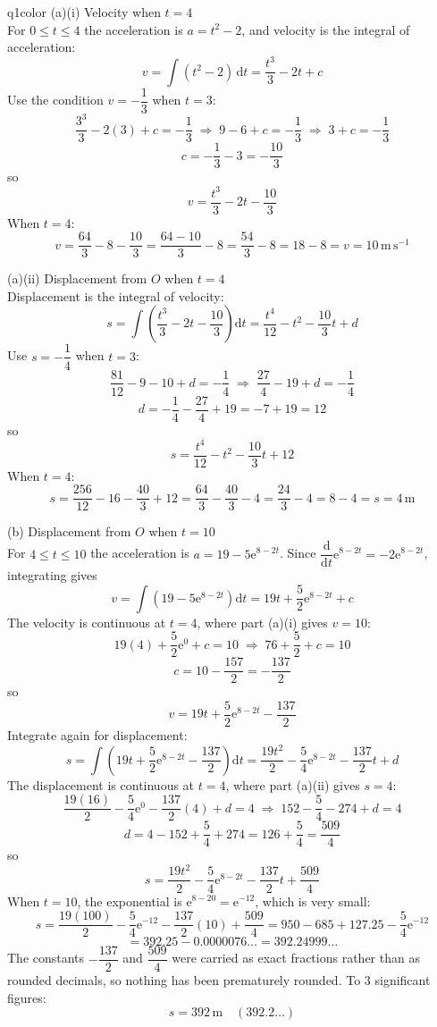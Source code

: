 \documentclass[11pt,a4paper]{article}
\newcommand{\dd}{\mathrm{d}}
\begin{document}
\begin{ansbox}{q1color}
(a)(i) Velocity when $t = 4$\\[4pt]
For $0 \le t \le 4$ the acceleration is $a = t^2 - 2$, and velocity is the integral of acceleration:
\[
v = \int (t^2 - 2)\,\dd t = \frac{t^3}{3} - 2t + c
\]
Use the condition $v = -\dfrac{1}{3}$ when $t = 3$:
\[
\frac{3^3}{3} - 2(3) + c = -\frac{1}{3} \;\Rightarrow\; 9 - 6 + c = -\frac{1}{3} \;\Rightarrow\; 3 + c = -\frac{1}{3}
\]
\[
c = -\frac{1}{3} - 3 = -\frac{10}{3}
\]
so
\[
v = \frac{t^3}{3} - 2t - \frac{10}{3}
\]
When $t = 4$:
\[
v = \frac{64}{3} - 8 - \frac{10}{3} = \frac{64 - 10}{3} - 8 = \frac{54}{3} - 8 = 18 - 8 = \boxed{v = 10 \,\text{m}\,\text{s}^{-1}}
\]

(a)(ii) Displacement from $O$ when $t = 4$\\[4pt]
Displacement is the integral of velocity:
\[
s = \int\left(\frac{t^3}{3} - 2t - \frac{10}{3}\right)\dd t = \frac{t^4}{12} - t^2 - \frac{10}{3}t + d
\]
Use $s = -\dfrac{1}{4}$ when $t = 3$:
\[
\frac{81}{12} - 9 - 10 + d = -\frac{1}{4} \;\Rightarrow\; \frac{27}{4} - 19 + d = -\frac{1}{4}
\]
\[
d = -\frac{1}{4} - \frac{27}{4} + 19 = -7 + 19 = 12
\]
so
\[
s = \frac{t^4}{12} - t^2 - \frac{10}{3}t + 12
\]
When $t = 4$:
\[
s = \frac{256}{12} - 16 - \frac{40}{3} + 12 = \frac{64}{3} - \frac{40}{3} - 4 = \frac{24}{3} - 4 = 8 - 4 = \boxed{s = 4 \,\text{m}}
\]

(b) Displacement from $O$ when $t = 10$\\[4pt]
For $4 \le t \le 10$ the acceleration is $a = 19 - 5\mathrm{e}^{8-2t}$. Since $\dfrac{\dd}{\dd t}\mathrm{e}^{8-2t} = -2\mathrm{e}^{8-2t}$, integrating gives
\[
v = \int\left(19 - 5\mathrm{e}^{8-2t}\right)\dd t = 19t + \frac{5}{2}\mathrm{e}^{8-2t} + c
\]
The velocity is continuous at $t = 4$, where part (a)(i) gives $v = 10$:
\[
19(4) + \frac{5}{2}\mathrm{e}^{0} + c = 10 \;\Rightarrow\; 76 + \frac{5}{2} + c = 10
\]
\[
c = 10 - \frac{157}{2} = -\frac{137}{2}
\]
so
\[
v = 19t + \frac{5}{2}\mathrm{e}^{8-2t} - \frac{137}{2}
\]
Integrate again for displacement:
\[
s = \int\left(19t + \frac{5}{2}\mathrm{e}^{8-2t} - \frac{137}{2}\right)\dd t = \frac{19t^2}{2} - \frac{5}{4}\mathrm{e}^{8-2t} - \frac{137}{2}t + d
\]
The displacement is continuous at $t = 4$, where part (a)(ii) gives $s = 4$:
\[
\frac{19(16)}{2} - \frac{5}{4}\mathrm{e}^{0} - \frac{137}{2}(4) + d = 4 \;\Rightarrow\; 152 - \frac{5}{4} - 274 + d = 4
\]
\[
d = 4 - 152 + \frac{5}{4} + 274 = 126 + \frac{5}{4} = \frac{509}{4}
\]
so
\[
s = \frac{19t^2}{2} - \frac{5}{4}\mathrm{e}^{8-2t} - \frac{137}{2}t + \frac{509}{4}
\]
When $t = 10$, the exponential is $\mathrm{e}^{8-20} = \mathrm{e}^{-12}$, which is very small:
\[
s = \frac{19(100)}{2} - \frac{5}{4}\mathrm{e}^{-12} - \frac{137}{2}(10) + \frac{509}{4} = 950 - 685 + 127.25 - \frac{5}{4}\mathrm{e}^{-12}
\]
\[
= 392.25 - 0.0000076\ldots = 392.24999\ldots
\]
The constants $-\dfrac{137}{2}$ and $\dfrac{509}{4}$ were carried as exact fractions rather than as rounded decimals, so nothing has been prematurely rounded. To 3 significant figures:
\[
\boxed{s = 392 \,\text{m}} \quad (392.2\ldots)
\]
\end{ansbox}
\end{document}

